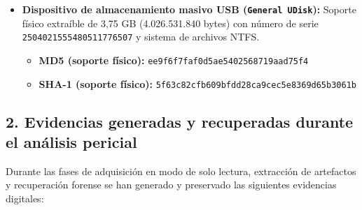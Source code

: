 \begin{itemize}[leftmargin=1.5em, itemsep=0.55em]
	\item \textbf{Dispositivo de almacenamiento masivo USB (\texttt{General UDisk}):} Soporte físico extraíble de 3,75 GB (4.026.531.840 bytes) con número de serie \texttt{2504021555480511776507} y sistema de archivos NTFS.
	\begin{itemize}[leftmargin=1.2em]
		\item \textbf{MD5 (soporte físico):} \texttt{ee9f6f7faf0d5ae5402568719aad75f4}
		\item \textbf{SHA-1 (soporte físico):} \texttt{5f63c82cfb609bfdd28ca9cec5e8369d65b3061b}
	\end{itemize}
\end{itemize}

\subsection*{2. Evidencias generadas y recuperadas durante el análisis pericial}

Durante las fases de adquisición en modo de solo lectura, extracción de artefactos y recuperación forense se han generado y preservado las siguientes evidencias digitales:

